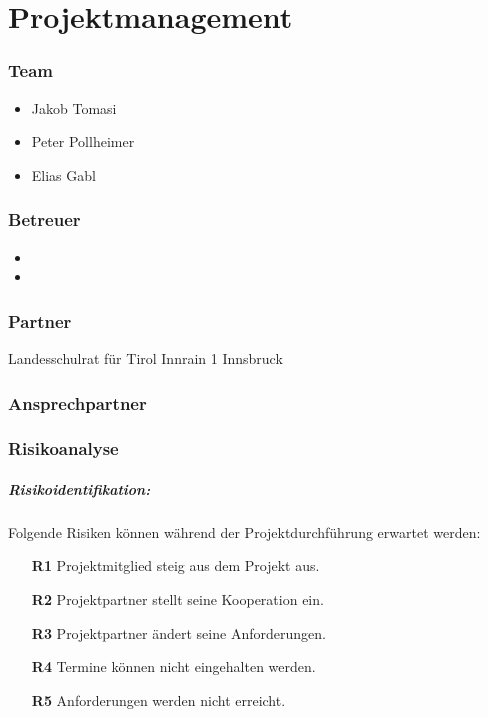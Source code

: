 \def \currentAuthor {Das Projektteam} %

\chapter{Projektmanagement}
\subsection{Team}

\begin{itemize}
	\item Jakob Tomasi
	\item Peter Pollheimer
	\item Elias Gabl
\end{itemize}
\subsection{Betreuer}
\begin{itemize}
	\item \getSteff
	\item \getAlex
\end{itemize}
\subsection{Partner}
Landesschulrat für Tirol
\newline
Innrain 1
 Innsbruck
\subsection{Ansprechpartner}
\getHammerl
\newpage

\subsection{Risikoanalyse}
\paragraph{Risikoidentifikation:}

Folgende Risiken können während der Projektdurchführung erwartet werden:
\begin{itemize}
	\item[\textbf{R1}] Projektmitglied steig aus dem Projekt aus.
	\item[\textbf{R2}] Projektpartner stellt seine Kooperation ein.
	\item[\textbf{R3}] Projektpartner ändert seine Anforderungen.
	\item[\textbf{R4}] Termine können nicht eingehalten werden.
	\item[\textbf{R5}] Anforderungen werden nicht erreicht.
\end{itemize}

